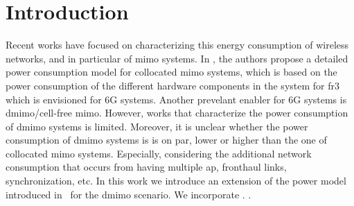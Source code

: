 \section{Introduction}

Recent works have focused on characterizing this energy consumption of wireless networks, and in particular of \gls{mimo} systems. In \cite{peschiera2026fr3}, the authors propose a detailed power consumption model for collocated \gls{mimo} systems, which is based on the power consumption of the different hardware components in the system for \gls{fr3}  which is envisioned for 6G systems. Another prevelant enabler for 6G systems is \gls{dmimo}/cell-free \gls{mimo}. However, works that characterize the power consumption of \gls{dmimo} systems is limited.  Moreover, it is unclear whether the power consumption of \gls{dmimo} systems is is on par, lower or higher than the one of collocated \gls{mimo} systems. Especially, considering the additional network consumption that occurs from having multiple \gls{ap}, fronthaul links, synchronization, etc. In this work we introduce an extension of the power model introduced in~\cite{peschiera2026fr3} for the \gls{dmimo} scenario. We incorporate . . 